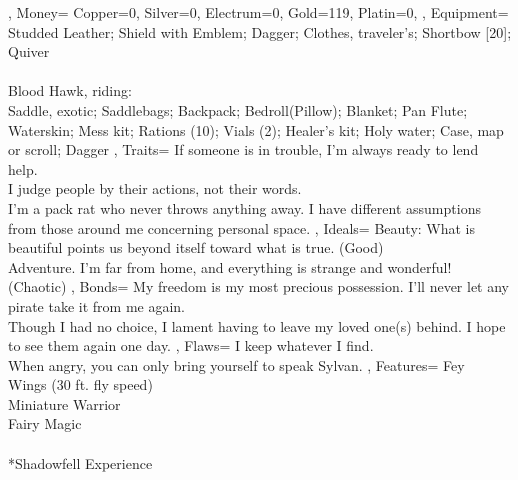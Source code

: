 \documentclass[10pt,a4paper]{scrbook}
\begin{document}
{{{			}
		},
		Money={
			Copper=0,
			Silver=0,
			Electrum=0,
			Gold=119,
			Platin=0,
		},
		Equipment={%
			Studded Leather; %
			Shield with Emblem; %
			Dagger; %
			Clothes, traveler's;%
			Shortbow [20]; %
			Quiver\\%
			\\
			Blood Hawk, riding:\\
			Saddle, exotic;
			Saddlebags;
			Backpack;
			Bedroll(Pillow);
			Blanket;
			Pan Flute;
			Waterskin;
			Mess kit;
			Rations (10);
			Vials (2);
			Healer's kit;
			Holy water;
			Case, map or scroll;
			Dagger
		},
		Traits={
			\tiny
			If someone is in trouble, I'm always ready to lend help.\\
			I judge people by their actions, not their words.\\
			I'm a pack rat who never throws anything away.
			I have different assumptions from those around me concerning personal space.
		},
		Ideals={
			\tiny
			Beauty: What is beautiful points us beyond itself toward what is true. (Good)\\
			Adventure. I'm far from home, and everything is strange and wonderful! (Chaotic)
		},
		Bonds={
			\tiny
			My freedom is my most precious possession. I’ll never let any pirate take it from me again.\\
			Though I had no choice, I lament having to leave my loved one(s) behind. I hope to see them again one day.
		},
		Flaws={
			\tiny
			I keep whatever I find.\\
			When angry, you can only bring yourself to speak Sylvan.
		},
		Features={
			Fey\\
			Wings (30 ft. fly speed) \\
			Miniature Warrior\\
			Fairy Magic\\
			\\
			*Shadowfell Experience\\
}}
\end{document}
